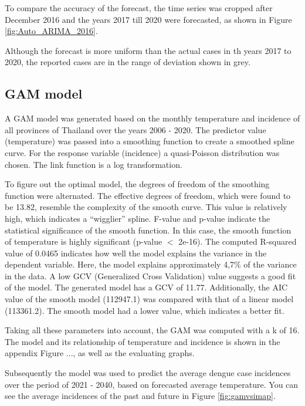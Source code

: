 	To compare the accuracy of the forecast, the time series was cropped after December 2016 and the years 2017 till 2020 were forecasted, as shown in Figure \ref{fig:Auto_ARIMA_2016}. 
	

Although the forecast is more uniform than the actual cases in th years 2017 to 2020, the reported cases are in the range of deviation shown in grey. 

\subsection{GAM model}
A GAM model was generated based on the monthly temperature and incidence of all provinces of Thailand over the years 2006 - 2020. The predictor value (temperature) was passed into a smoothing function to create a smoothed spline curve. For the response variable (incidence) a quasi-Poisson distribution was chosen. The link function is a log transformation.

To figure out the optimal model, the degrees of freedom of the smoothing function were alternated. The effective degrees of freedom, which were found to be 13.82, resemble the complexity of the smooth curve. This value is relatively high, which indicates a “wigglier” spline. F-value and p-value indicate the statistical significance of the smooth function. In this case, the smooth function of temperature is highly significant (p-value $<$ 2e-16). The computed R-squared value of 0.0465 indicates how well the model explains the variance in the dependent variable. Here, the model explains approximately 4,7\% of the variance in the data. A low GCV (Generalized Cross Validation) value suggests a good fit of the model. The generated model has a GCV of 11.77. Additionally, the AIC value of the smooth model (112947.1) was compared with that of a linear model (113361.2). The smooth model had a lower value, which indicates a better fit.

Taking all these parameters into account, the GAM was computed with a k of 16. The model and its relationship of temperature and incidence is shown in the appendix Figure ..., as well as the evaluating graphs.

Subsequently the model was used to predict the average dengue case incidences over the period of 2021 - 2040, based on forecasted average temperature. You can see the average incidences of the past and future in Figure \ref{fig:gamvsimap}.

